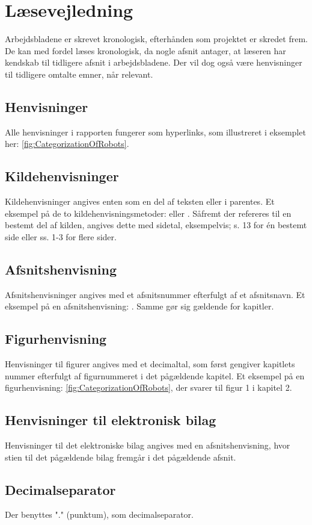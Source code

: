 \section*{Læsevejledning}
\label{Laesevejledning}
Arbejdsbladene er skrevet kronologisk, efterhånden som projektet er skredet frem. De kan med fordel læses kronologisk, da nogle afsnit antager, at læseren har kendskab til tidligere afsnit i arbejdsbladene. Der vil dog også være henvisninger til tidligere omtalte emner, når relevant.

\subsection*{Henvisninger}
Alle henvisninger i rapporten fungerer som hyperlinks, som illustreret i eksemplet her: \autoref{fig:CategorizationOfRobots}.
%
\subsection*{Kildehenvisninger}
Kildehenvisninger angives enten som en del af teksten eller i parentes. Et eksempel på de to kildehenvisningsmetoder: \textcite[s. 13]{PDF:RobotShiftFromIPtoSR} eller \parencite[s. 13]{PDF:RobotShiftFromIPtoSR}. Såfremt der refereres til en bestemt del af kilden, angives dette med sidetal, eksempelvis; s. 13 for én bestemt side eller ss. 1-3 for flere sider.
%
\subsection*{Afsnitshenvisning}
Afsnitshenvisninger angives med et afsnitsnummer efterfulgt af et afsnitsnavn. Et eksempel på en afsnitshenvisning: . Samme gør sig gældende for kapitler.
%
\subsection*{Figurhenvisning}
Henvisninger til figurer angives med et decimaltal, som først gengiver kapitlets nummer efterfulgt af figurnummeret i det pågældende kapitel. Et eksempel på en figurhenvisning: \autoref{fig:CategorizationOfRobots}, der svarer til figur 1 i kapitel 2. 
%
\subsection*{Henvisninger til elektronisk bilag}
Henvisninger til det elektroniske bilag angives med en afsnitshenvisning, hvor stien til det pågældende bilag fremgår i det pågældende afsnit. 

\subsection*{Decimalseparator}
Der benyttes "." (punktum), som decimalseparator.